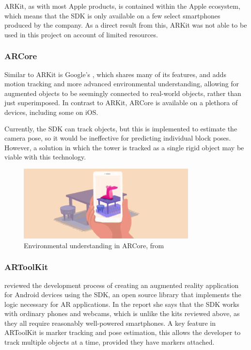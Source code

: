 ARKit, as with most Apple products, is contained within the Apple ecosystem, which means that the SDK is only available on a few select smartphones produced by the company. As a direct result from this, ARKit was not able to be used in this project on account of limited resources.

\subsubsection{ARCore}\label{sec:arcore}
Similar to ARKit is Google's \citet{arcore}, which shares many of its features, and adds motion tracking and more advanced environmental understanding, allowing for augmented objects to be seemingly connected to real-world objects, rather than just superimposed. In contrast to ARKit, ARCore is available on a plethora of devices, including some on iOS.

Currently, the SDK can track objects, but this is implemented to estimate the camera pose, so it would be ineffective for predicting individual block poses. However, a solution in which the tower is tracked as a single rigid object may be viable with this technology.

\begin{figure}[ht]
\begin{minipage}{\textwidth}
    \centering
    \includegraphics[width=0.8\textwidth]{images/litreview/EnvUnderstanding}
    \caption{Environmental understanding in ARCore, from \protect{}}
    \label{fig:arcoreenv}
\end{minipage}
\end{figure}

\subsubsection{ARToolKit}
\citet{artoolkitandroid} reviewed the development process of creating an augmented reality application for Android devices using the \citet{artoolkit} SDK, an open source library that implements the logic necessary for AR applications. In the report she says that the SDK works with ordinary phones and webcams, which is unlike the kits reviewed above, as they all require reasonably well-powered smartphones. A key feature in ARToolKit is marker tracking and pose estimation, this allows the developer to track multiple objects at a time, provided they have markers attached.

